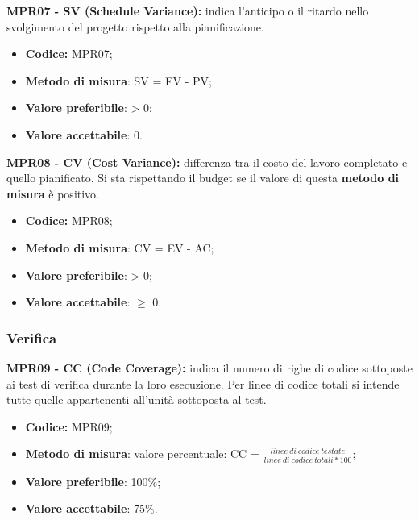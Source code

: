 \textbf{MPR07 - SV (Schedule Variance):} indica l'anticipo o il ritardo nello svolgimento del progetto rispetto alla pianificazione.
\begin{itemize}
    \item \textbf{Codice:} MPR07;
    \item \textbf{Metodo di misura}: SV = EV - PV;
    \item \textbf{Valore preferibile}: > 0;
    \item \textbf{Valore accettabile}: 0.
\end{itemize}
\textbf{MPR08 - CV (Cost Variance):} differenza tra il costo del lavoro completato e quello pianificato. Si sta rispettando il budget se il valore di questa \textbf{metodo di misura}
è positivo.
\begin{itemize}
    \item \textbf{Codice:} MPR08;
    \item \textbf{Metodo di misura}: CV = EV - AC;
    \item \textbf{Valore preferibile}: > 0;
    \item \textbf{Valore accettabile}: $\geq$ 0.
\end{itemize}
\subsubsection{Verifica}
\textbf{MPR09 - CC (Code Coverage):} indica il numero di righe di codice sottoposte ai test di verifica durante la loro esecuzione. Per linee di codice totali
si intende tutte quelle appartenenti all'unità sottoposta al test.
\begin{itemize}
    \item \textbf{Codice:} MPR09;
    \item \textbf{Metodo di misura}: valore percentuale: CC = $\frac{linee \ di \ codice \ testate}{linee \ di \ codice \ totali * 100}$;
    \item \textbf{Valore preferibile}: 100\%;
    \item \textbf{Valore accettabile}: 75\%.
\end{itemize}
